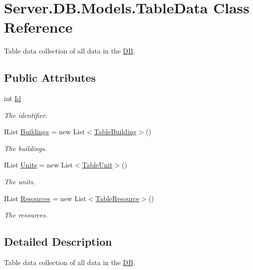 \hypertarget{classServer_1_1DB_1_1Models_1_1TableData}{}\section{Server.\+D\+B.\+Models.\+Table\+Data Class Reference}
\label{classServer_1_1DB_1_1Models_1_1TableData}


Table data collection of all data in the \hyperlink{namespaceServer_1_1DB}{D\+B}.  


\subsection*{Public Attributes}
\begin{DoxyCompactItemize}
\item 
int \hyperlink{classServer_1_1DB_1_1Models_1_1TableData_a61d88561b8476093477f356616571c5a}{Id}
\begin{DoxyCompactList}\small\item\em The identifier. \end{DoxyCompactList}\item 
I\+List \hyperlink{classServer_1_1DB_1_1Models_1_1TableData_a843ace663a9074a04e14d35ac93c19b3}{Buildings} = new List$<$\hyperlink{classServer_1_1DB_1_1Models_1_1TableBuilding}{Table\+Building}$>$()
\begin{DoxyCompactList}\small\item\em The buildings. \end{DoxyCompactList}\item 
I\+List \hyperlink{classServer_1_1DB_1_1Models_1_1TableData_a5357a9d0799a986087e94458897ce6f9}{Units} = new List$<$\hyperlink{classServer_1_1DB_1_1Models_1_1TableUnit}{Table\+Unit}$>$()
\begin{DoxyCompactList}\small\item\em The units. \end{DoxyCompactList}\item 
I\+List \hyperlink{classServer_1_1DB_1_1Models_1_1TableData_ad37f859f89ae46c48eb18469f22ba57d}{Resources} = new List$<$\hyperlink{classServer_1_1DB_1_1Models_1_1TableResource}{Table\+Resource}$>$()
\begin{DoxyCompactList}\small\item\em The resources. \end{DoxyCompactList}\end{DoxyCompactItemize}


\subsection{Detailed Description}
Table data collection of all data in the \hyperlink{namespaceServer_1_1DB}{D\+B}. 



